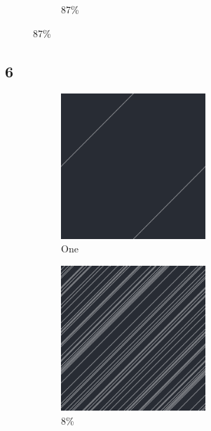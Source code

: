 \documentclass[12pt, fleqn]{report}                             %
\theoremstyle{break}                                            %
\begin{document}
\begin{figure}[ht!]
\begin{subfigure}[b]{0.4\linewidth}
          \caption{87\%}
        \end{subfigure}
      \end{figure}


      \clearpage
      \subsection{6}
      \begin{figure}[ht!]
        \centering
        \begin{subfigure}[b]{0.4\linewidth}
          \includegraphics[width=0.6\textwidth]{Images/6/a.png}
          \caption{One}
        \end{subfigure}
        \begin{subfigure}[b]{0.4\linewidth}
          \includegraphics[width=0.6\textwidth]{Images/6/b.png}
          \caption{8\%}
        \end{subfigure}
        \begin{subfigure}[b]{0.4\linewidth}

\end{subfigure}
\end{figure}
\end{document}
